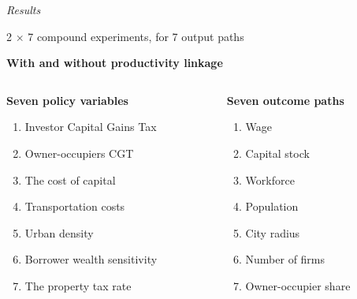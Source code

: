 \documentclass[hide notes=show/only]{beamer} %
\begin{document}
\begin{frame}{}
  \centering \Large
  \emph{Results}
\end{frame}


\begin{frame}{2 $\times$ 7 compound experiments, for 7 output paths}

\hspace{-.3cm}\textbf{With and without productivity linkage}
\vspace{.5cm}
\begin{columns}
\begin{column}{0.5\textwidth}
\textbf{Seven policy variables}
\begin{enumerate}
\item Investor Capital Gains Tax
\item Owner-occupiers CGT

\item The cost of capital%
\item Transportation costs%
\item Urban density%
\item Borrower wealth sensitivity%
\item The property tax rate%
\end{enumerate}
\end{column}
\begin{column}{0.5\textwidth}
\textbf{Seven outcome paths}  
\begin{enumerate}
   \item Wage \item Capital stock\item Workforce   \item Population \item City radius \item  Number of firms
\item Owner-occupier share
\end{enumerate}
\end{column}
\end{columns}
\vspace{.3cm}

\end{frame}%
\end{document}
